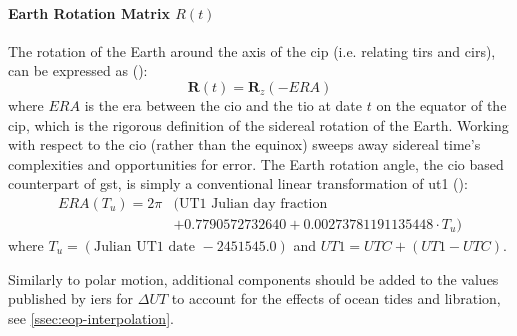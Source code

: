 
\paragraph{Earth Rotation Matrix $R(t)$}\label{par:earth-rotation-matrix}
The rotation of the Earth around the axis of the \gls{cip} (i.e. relating 
\gls{tirs} and \gls{cirs}), can be expressed as (\cite{iers2010}):
\begin{equation}
  \bm{R}(t) = \bm{R}_z (-ERA)
  \label{eq:iers1055}
\end{equation}
where $ERA$ is the \gls{era} between the \gls{cio} and the \gls{tio} 
at date $t$ on the equator of the \gls{cip}, which is the rigorous definition 
of the sidereal rotation of the Earth. Working with respect to the \gls{cio} 
(rather than the equinox) sweeps away sidereal time's complexities and opportunities 
for error. The Earth rotation angle, the \gls{cio} based counterpart of \gls{gst},
is simply a conventional linear transformation of \gls{ut1} (\cite{sofa_18141_eacb}):
\begin{equation}
  \label{eq:iers10515}
  \begin{split}
    ERA(T_u) = 2 \pi & ( \text{UT1 Julian day fraction } \\
                     & + 0.7790572732640 + 0.00273781191135448 \cdot T_u )
    \end{split}
\end{equation}
where $T_u = \left( \text{Julian UT1 date } - 2451545.0 \right)$ and 
$UT1=UTC+(UT1-UTC)$. 

Similarly to polar motion, additional components should 
be added to the values published by \gls{iers} for $\Delta UT$ to account for 
the effects of ocean tides and libration, see \autoref{ssec:eop-interpolation}. 


